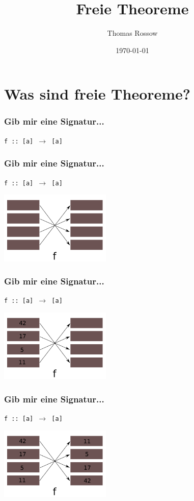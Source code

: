 \documentclass{beamer}
\title{Freie Theoreme}
\author{Thomas Rossow}
\date{\today}
\begin{document}
\maketitle
\frame{\tableofcontents}

\section{Was sind freie Theoreme?}

\begin{frame}
\frametitle{Gib mir eine Signatur...}
\begin{center}
\texttt{f :: [a] $\rightarrow$ [a]}
\end{center}
\end{frame}

\begin{frame}
\frametitle{Gib mir eine Signatur...}
\begin{center}
\texttt{f :: [a] $\rightarrow$ [a]}

\includegraphics[width=200px]{list-order-blank}
\end{center}
\end{frame}

\begin{frame}
\frametitle{Gib mir eine Signatur...}
\begin{center}
\texttt{f :: [a] $\rightarrow$ [a]}

\includegraphics[width=200px]{list-order-onlyleft}
\end{center}
\end{frame}

\begin{frame}
\begin{center}
\frametitle{Gib mir eine Signatur...}
\texttt{f :: [a] $\rightarrow$ [a]}

\includegraphics[width=200px]{list-order}
\end{center}
\end{frame}
\end{document}
